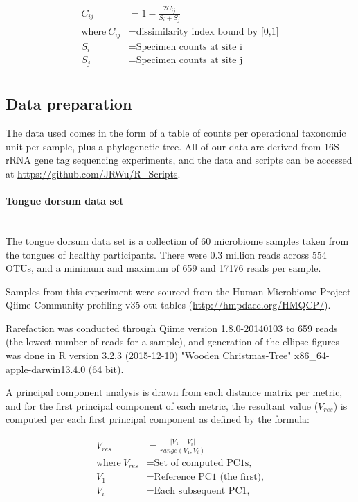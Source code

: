 \documentclass[10pt,letterpaper]{article}
\begin{document}
\begin{align*}
C_{ij} &= 1 - \frac{2C_{ij}}{S_{i} + S_{j}} \\
\text{where}~C_{ij}&= \text{dissimilarity index bound by [0,1]} \\
  S_{i} &= \text{Specimen counts at site i} \\
  S_{j} &= \text{Specimen counts at site j} \\
\end{align*}

\subsection{Data preparation}
The data used comes in the form of a table of counts per operational taxonomic unit per sample, plus a phylogenetic tree. All of our data are derived from 16S rRNA gene tag sequencing experiments, and the data and scripts can be accessed at \url{https://github.com/JRWu/R_Scripts}.

\paragraph{Tongue dorsum data set}\mbox{}\\
The tongue dorsum data set is a collection of 60 microbiome samples taken from the tongues of healthy participants. There were 0.3 million reads across 554 OTUs, and a minimum and maximum of 659 and 17176 reads per sample.

Samples from this experiment were sourced from the Human Microbiome Project \cite{turnbaugh2007human} Qiime Community profiling v35 otu tables (\url{http://hmpdacc.org/HMQCP/}).

Rarefaction was conducted through Qiime version 1.8.0-20140103 to 659 reads (the lowest number of reads for a sample), and generation of the ellipse figures was done in R version 3.2.3 (2015-12-10) "Wooden Christmas-Tree" x86\_64-apple-darwin13.4.0 (64 bit).

A principal component analysis is drawn from each distance matrix per metric, and for the first principal component of each metric, the resultant value ($V_{res}$) is computed per each first principal component as defined by the formula:

\begin{align*}
  V_{res} &=\frac{|V_1 - V_i|}{range(V_1, V_i)} \\
  \text{where}~V_{res}&= \text{Set of computed PC1s,} \\
  V_1 &= \text{Reference PC1 (the first),} \\
  V_i &= \text{Each subsequent PC1,} \\
\end{align*}
\end{document}
